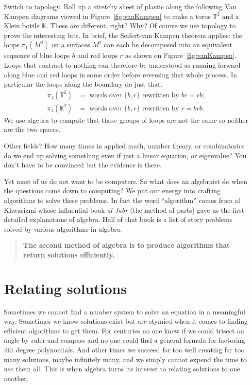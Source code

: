 Switch to topology.   Roll up a stretchy sheet of plastic along the following 
Van Kampen diagrams  viewed in Figure~\ref{fig:vanKampen} to make a torus $\mathbb{T}^2$ 
and a Klein bottle $\mathbb{K}$.  These are different, right?  Why?  Of course we use topology 
to prove the interesting bits.  In brief, the Seifert-van Kampen theorem applies: 
the loops $\pi_1(M^2)$ on a surfaces $M^2$ can each be decomposed into an 
equivalent sequence of blue loops $b$ and red loops $r$ as shown on Figure~\ref{fig:vanKampen}.
Loops that contract to nothing can therefore be understood as running forward
along blue and red loops in some order before reversing that whole process.  In particular
the loops along the boundary do just that.  
\begin{align*}
    \pi_1(\mathbb{T}^2) &= \text{ words over }\{b,r\} \text{ rewritten by }br=rb;
    \\
    \pi_1(\mathbb{K}^2) &= \text{ words over }\{b,r\} \text{ rewritten by } r=brb. 
\end{align*}
We use algebra to compute that those groups of loops are not the same so neither are the two spaces.

Other fields?  How many times in applied math, number theory, or combinatorics
do we end up solving something even if just a linear equation, or eigenvalue?  You don't have to be convinced but the evidence is there.

Yet most of us do not want to be computers.  So what does an algebraist do 
when the questions come down to computing?  We put our energy into crafting 
algorithms to solve these problems.  In fact the word ``algorithm'' comes 
from al Khwarizmi whose influential book \emph{al Jabr} (the method of parts)
gave us the first detailed explanations of algebra.  Half of that book 
is a list of story problems solved by various algorithms in algebra.
\begin{quote}
    \textbf{The second method of algebra is to produce algorithms 
    that return solutions efficiently.}
\end{quote}


\section{Relating solutions}
Sometimes we cannot find a number system to solve an equation
in a meaningful way.  Sometimes we know solutions exist but are stymied 
when it comes to finding efficient algorithms to get them.  For centuries 
no one knew if we could trisect an angle by ruler and compass and no one 
could find a general formula for factoring 4th degree polynomials.  And other 
times we succeed far too well creating far too many solutions, 
maybe infinitely many, and we simply cannot expend the time to use them all.
This is when algebra turns its interest to relating solutions to one another.

